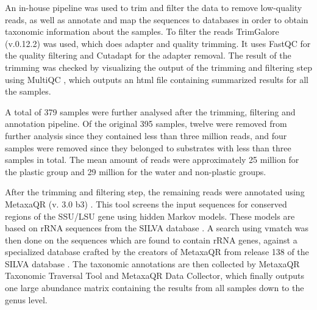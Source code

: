 
An in-house pipeline \cite{wenne2025Pipeline1} was used to trim and filter the data to remove low-quality reads, as well as annotate and map the sequences to databases in order to obtain taxonomic information about the samples.
To filter the reads TrimGalore (v.0.12.2) \cite{krueger2023TrimGalore0122} was used, which does adapter and quality trimming. It uses FastQC for the quality filtering and Cutadapt for the adapter removal.
The result of the trimming was checked by visualizing the output of the trimming and filtering step using MultiQC \cite{ewels2016MultiQCSummarizeAnalysis}, which outputs an html file containing summarized results for all the samples. 

A total of 379 samples were further analysed after the trimming, filtering and annotation pipeline.  
Of the original 395 samples, twelve were removed from further analysis since they contained less than three million reads, and four samples were removed since they belonged to substrates with less than three samples in total.
The mean amount of reads were approximately 25 million for the plastic group and 29 million for the water and non-plastic groups.


After the trimming and filtering step, the remaining reads were annotated using MetaxaQR (v. 3.0 b3) \cite{bengtsson-palme2015Metaxa2Improved}. This tool screens the input sequences for conserved regions of the SSU/LSU gene using hidden Markov models. These models are based on rRNA sequences from the SILVA database \cite{quast2012SILVARibosomalRNA}.
    A search using vmatch \cite{kurtzVmatchLargeScale} was then done on the sequences which are found to contain rRNA genes, against a specialized database crafted by the creators of MetaxaQR from release 138 of the SILVA database \cite{bengtsson-palmeMetaxaQRFAQMicrobiologyse}.%
The taxonomic annotations are then collected by MetaxaQR Taxonomic Traversal Tool and MetaxaQR Data Collector, which finally outputs one large abundance matrix containing the results from all samples down to the genus level. 

